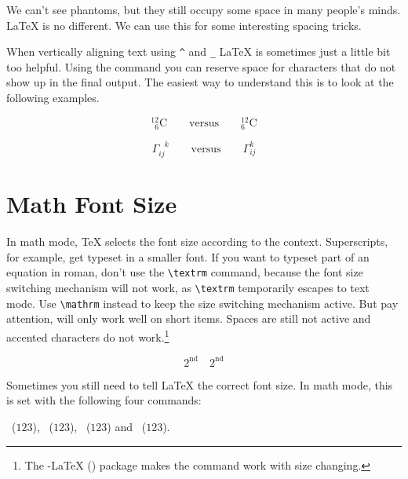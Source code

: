 We can't see phantoms, but they still occupy some space in many people's minds.
\LaTeX{} is no different. We can use this for
some interesting spacing tricks.

When vertically aligning text using \verb|^| and \verb|_| \LaTeX{} is sometimes
just a little bit too helpful. Using the  command you can
reserve space for characters that do not show up in the final output.
The easiest way to understand this is to look at the following examples.
\begin{example}
\begin{displaymath}
{}^{12}_{\phantom{1}6}\textrm{C}
\qquad \textrm{versus} \qquad
{}^{12}_{6}\textrm{C}
\end{displaymath}
\end{example}
\begin{example}
\begin{displaymath} 
\Gamma_{ij}^{\phantom{ij}k}
\qquad \textrm{versus} \qquad
\Gamma_{ij}^{k}
\end{displaymath}  
\end{example}

\section{Math Font Size}\label{sec:fontsz}

 In math mode, \TeX{} selects the font size
according to the context. Superscripts, for example, get typeset in a
smaller font. If you want to typeset part of an equation in roman,
don't use the \verb|\textrm| command, because the font size switching
mechanism will not work, as \verb|\textrm| temporarily escapes to text
mode. Use \verb|\mathrm| instead to keep the size switching mechanism
active. But pay attention,  will only work well on short
items. Spaces are still not active and accented characters do not
work.\footnote{The \AmS-\LaTeX{} () package makes the  command
  work with size changing.}
\begin{example}
\begin{equation}
2^{\textrm{nd}} \quad 
2^{\mathrm{nd}}
\end{equation}
\end{example}

Sometimes you still need to tell \LaTeX{} the correct font
size. In math mode, this is set with the following four commands:
\begin{flushleft}
~($\displaystyle 123$),
 ~($\textstyle 123$), 
~($\scriptstyle 123$) and
~($\scriptscriptstyle 123$).
\end{flushleft}

